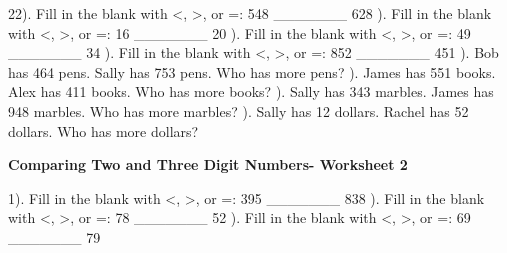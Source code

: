 \documentclass{article}%
\begin{document}
22). Fill in the blank with <, >, or =: 548 \_\_\_\_\_\_\_ 628%
\newline%
\newline%
). Fill in the blank with <, >, or =: 16 \_\_\_\_\_\_\_ 20%
\newline%
\newline%
). Fill in the blank with <, >, or =: 49 \_\_\_\_\_\_\_ 34%
\newline%
\newline%
). Fill in the blank with <, >, or =: 852 \_\_\_\_\_\_\_ 451%
\newline%
\newline%
). Bob has 464 pens. Sally has 753 pens. Who has more pens?%
\newline%
\newline%
). James has 551 books. Alex has 411 books. Who has more books?%
\newline%
\newline%
). Sally has 343 marbles. James has 948 marbles. Who has more marbles?%
\newline%
\newline%
). Sally has 12 dollars. Rachel has 52 dollars. Who has more dollars?%
\newline%
\newline%
\newline%
\pagebreak%
\large%
\begin{center}%
\textbf{Comparing Two and Three Digit Numbers- Worksheet 2}%
\newline%
\newline%
\newline%
\end{center} \normalsize%
1). Fill in the blank with <, >, or =: 395 \_\_\_\_\_\_\_ 838%
\newline%
\newline%
). Fill in the blank with <, >, or =: 78 \_\_\_\_\_\_\_ 52%
\newline%
\newline%
). Fill in the blank with <, >, or =: 69 \_\_\_\_\_\_\_ 79%
\newline%
\end{document}
